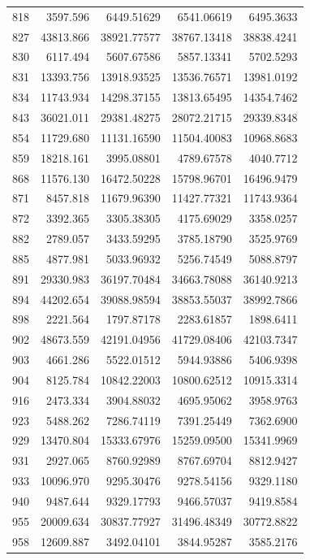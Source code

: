 \documentclass[
  12pt,
]{article}
\begin{document}
\begin{longtable}[]{@{}lrrrr@{}}
818 & 3597.596 & 6449.51629 & 6541.06619 & 6495.3633 \\
827 & 43813.866 & 38921.77577 & 38767.13418 & 38838.4241 \\
830 & 6117.494 & 5607.67586 & 5857.13341 & 5702.5293 \\
831 & 13393.756 & 13918.93525 & 13536.76571 & 13981.0192 \\
834 & 11743.934 & 14298.37155 & 13813.65495 & 14354.7462 \\
843 & 36021.011 & 29381.48275 & 28072.21715 & 29339.8348 \\
854 & 11729.680 & 11131.16590 & 11504.40083 & 10968.8683 \\
859 & 18218.161 & 3995.08801 & 4789.67578 & 4040.7712 \\
868 & 11576.130 & 16472.50228 & 15798.96701 & 16496.9479 \\
871 & 8457.818 & 11679.96390 & 11427.77321 & 11743.9364 \\
872 & 3392.365 & 3305.38305 & 4175.69029 & 3358.0257 \\
882 & 2789.057 & 3433.59295 & 3785.18790 & 3525.9769 \\
885 & 4877.981 & 5033.96932 & 5256.74549 & 5088.8797 \\
891 & 29330.983 & 36197.70484 & 34663.78088 & 36140.9213 \\
894 & 44202.654 & 39088.98594 & 38853.55037 & 38992.7866 \\
898 & 2221.564 & 1797.87178 & 2283.61857 & 1898.6411 \\
902 & 48673.559 & 42191.04956 & 41729.08406 & 42103.7347 \\
903 & 4661.286 & 5522.01512 & 5944.93886 & 5406.9398 \\
904 & 8125.784 & 10842.22003 & 10800.62512 & 10915.3314 \\
916 & 2473.334 & 3904.88032 & 4695.95062 & 3958.9763 \\
923 & 5488.262 & 7286.74119 & 7391.25449 & 7362.6900 \\
929 & 13470.804 & 15333.67976 & 15259.09500 & 15341.9969 \\
931 & 2927.065 & 8760.92989 & 8767.69704 & 8812.9427 \\
933 & 10096.970 & 9295.30476 & 9278.54156 & 9329.1180 \\
940 & 9487.644 & 9329.17793 & 9466.57037 & 9419.8584 \\
955 & 20009.634 & 30837.77927 & 31496.48349 & 30772.8822 \\
958 & 12609.887 & 3492.04101 & 3844.95287 & 3585.2176 \\

\end{longtable}
\end{document}
